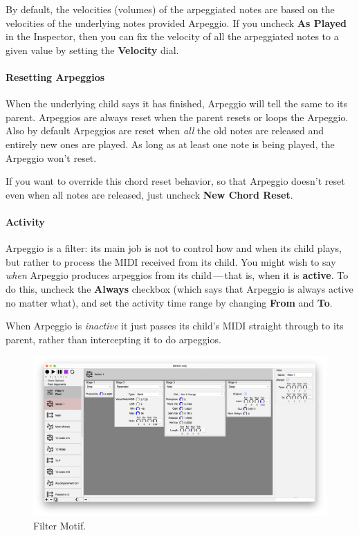 \documentclass[twoside,10pt]{article}
\newcommand\bump{\vspace{10in}}
\begin{document}
By default, the velocities (volumes) of the arpeggiated notes are based on the velocities of the underlying notes provided Arpeggio.  If you uncheck {\bf As Played} in the Inspector, then you can fix the velocity of all the arpeggiated notes to a given value by setting the {\bf Velocity} dial.

\paragraph{Resetting Arpeggios}

When the underlying child says it has finished, Arpeggio will tell the same to its parent.  Arpeggios are always reset when the parent resets or loops the Arpeggio.  Also by default Arpeggios are reset when {\it all} the old notes are released and entirely new ones are played. As long as at least one note is being played, the Arpeggio won't reset.

If you want to override this chord reset behavior, so that Arpeggio doesn't reset even when all notes are released, just uncheck {\bf New Chord Reset}.

\paragraph{Activity}

Arpeggio is a filter: its main job is not to control how and when its child plays, but rather to process the MIDI received from its child.  You might wish to say {\it when} Arpeggio produces arpeggios from its child\,---\,that is,  when it is {\bf active}.  To do this, uncheck the {\bf Always} checkbox (which says that Arpeggio is always active no matter what), and set the activity time range by changing {\bf From} and {\bf To}.  

When Arpeggio is {\it inactive} it just passes its child's MIDI straight through to its parent, rather than intercepting it to do arpeggios.

\bump

\begin{figure}[t]
\centering
\includegraphics[width=6.5in]{Filter}
\vspace{-2em}
\caption{Filter Motif.}
\label{filter}
\end{figure}
\end{document}
